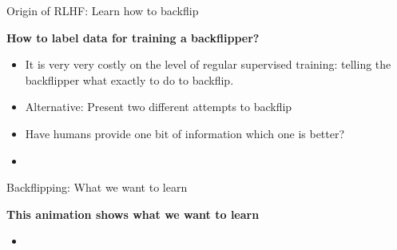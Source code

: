 \begin{vbframe}{Origin of RLHF: Learn how to backflip}

\vfill

\textbf{How to label data for training a backflipper?}

	\begin{itemize}
		\item It is very very costly on the level of
		regular supervised training: telling the
		backflipper what exactly to do to backflip.
                \item Alternative: Present two different
		attempts to backflip
                \item Have humans provide one bit of
		information which one is better?
\item
\href{https://openai.com/research/learning-from-human-preferences}{}

	\end{itemize}

\vfill

\end{vbframe}


\begin{vbframe}{Backflipping: What we want to learn}

\vfill

\textbf{This animation shows what we want to learn}

	\begin{itemize}
		\item \href{https://images.openai.com/blob/cf6fdf49-ea9e-489d-a1f1-9753291cd09e/humanfeedbackjump.gif}{}

	\end{itemize}

\vfill

\end{vbframe}

